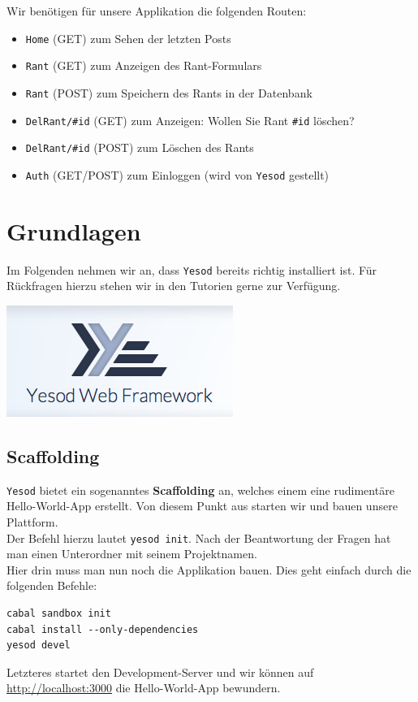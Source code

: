 \documentclass{beamer}
\begin{document}
\begin{frame}[fragile]
Wir benötigen für unsere Applikation die folgenden Routen:\pause
\begin{itemize}
 \item \texttt{Home} (GET) zum Sehen der letzten Posts
 \pause
 \item \texttt{Rant} (GET) zum Anzeigen des Rant-Formulars
 \pause
 \item \texttt{Rant} (POST) zum Speichern des Rants in der Datenbank
 \pause
 \item \texttt{DelRant/\#id} (GET) zum Anzeigen: \glqq Wollen Sie Rant \texttt{\#id} löschen?\grqq
 \pause
 \item \texttt{DelRant/\#id} (POST) zum Löschen des Rants
 \pause
 \item \texttt{Auth} (GET/POST) zum Einloggen (wird von \texttt{Yesod} gestellt)
\end{itemize}

\end{frame}


\section{Grundlagen}

\begin{frame}
Im Folgenden nehmen wir an, dass \texttt{Yesod} bereits richtig installiert ist. Für Rückfragen hierzu stehen wir in den Tutorien gerne zur Verfügung.\bigskip

\begin{center}
\includegraphics[scale=0.75]{yesod.png} 
\end{center}
\end{frame}

\subsection{Scaffolding}

\begin{frame}[fragile]
\texttt{Yesod} bietet ein sogenanntes \textbf{Scaffolding} an, welches einem eine rudimentäre Hello-World-App erstellt. Von diesem Punkt aus starten wir und bauen unsere Plattform.\\\pause
Der Befehl hierzu lautet \texttt{yesod init}. Nach der Beantwortung der Fragen hat man einen Unterordner mit seinem Projektnamen.\\\pause
Hier drin muss man nun noch die Applikation bauen. Dies geht einfach durch die folgenden Befehle:
\begin{verbatim}
cabal sandbox init
cabal install --only-dependencies
yesod devel
\end{verbatim}
\pause
Letzteres startet den Development-Server und wir können auf \url{http://localhost:3000} die Hello-World-App bewundern.
\end{frame}
\end{document}
